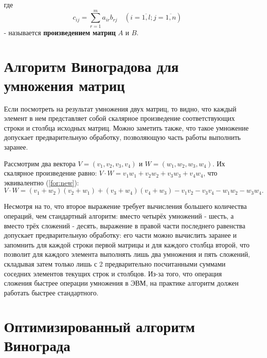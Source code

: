 где
\begin{equation}
	\label{eq:M}
	c_{ij} =
	\sum_{r=1}^{m} a_{ir}b_{rj} \quad (i=\overline{1,l}; j=\overline{1,n})
\end{equation}
- называется \textbf{произведением матриц} $A$ и $B$.

\clearpage

\section{Алгоритм Виноградова для умножения матриц}

Если посмотреть на результат умножения двух матриц, то видно, что каждый элемент в нем представляет собой скалярное произведение соответствующих строки и столбца исходных матриц.
Можно заметить также, что такое умножение допускает предварительную обработку, позволяющую часть работы выполнить заранее.

Рассмотрим два вектора $V = (v_1, v_2, v_3, v_4)$ и $W = (w_1, w_2, w_3, w_4)$.
Их скалярное произведение равно: $V \cdot W = v_1w_1 + v_2w_2 + v_3w_3 + v_4w_4$, что эквивалентно (\ref{for:new}):
\begin{equation}
	\label{for:new}
		V \cdot W = (v_1 + w_2)(v_2 + w_1) + (v_3 + w_4)(v_4 + w_3) - v_1v_2 - v_3v_4 - w_1w_2 - w_3w_4.
\end{equation}

Несмотря на то, что второе выражение требует вычисления большего количества операций, чем стандартный алгоритм: вместо четырёх умножений - шесть, а вместо трёх сложений - десять, выражение в правой части последнего равенства допускает предварительную обработку: его части можно вычислить заранее и запомнить для каждой строки первой матрицы и для каждого столбца второй, что позволит для каждого элемента выполнять лишь два умножения и пять сложений, складывая затем только лишь с 2 предварительно посчитанными суммами соседних элементов текущих строк и столбцов.
Из-за того, что операция сложения быстрее операции умножения в ЭВМ, на практике алгоритм должен работать быстрее стандартного.

\clearpage
\section{Оптимизированный алгоритм Винограда}

